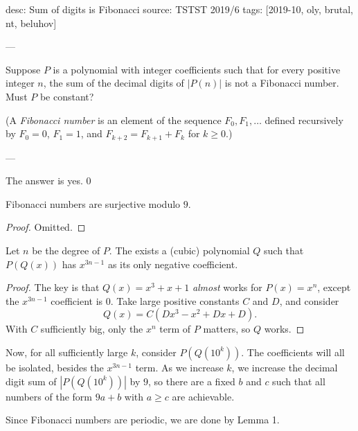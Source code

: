 desc: Sum of digits is Fibonacci
source: TSTST 2019/6
tags: [2019-10, oly, brutal, nt, beluhov]

---

Suppose $P$ is a polynomial with integer coefficients such that for every positive integer $n$, the sum of the decimal digits of $|P(n)|$ is not a Fibonacci number. Must $P$ be constant?

(A \emph{Fibonacci number} is an element of the sequence $F_0,F_1,\ldots$ defined recursively by $F_0=0$, $F_1=1$, and $F_{k+2}=F_{k+1}+F_k$ for $k\ge 0$.)

---

The answer is yes.
\setcounter{boxlemma}0
\begin{boxlemma}
    Fibonacci numbers are surjective modulo $9$.
\end{boxlemma}
\begin{proof}
    Omitted.
\end{proof}
\begin{boxlemma}
    Let $n$ be the degree of $P$. The exists a (cubic) polynomial $Q$ such that $P(Q(x))$ has $x^{3n-1}$ as its only negative coefficient.
\end{boxlemma}
\begin{proof}
    The key is that $Q(x)=x^3+x+1$ \emph{almost} works for $P(x)=x^n$, except the $x^{3n-1}$ coefficient is $0$. Take large positive constants $C$ and $D$, and consider \[Q(x)=C(Dx^3-x^2+Dx+D).\]
    With $C$ sufficiently big, only the $x^n$ term of $P$ matters, so $Q$ works.
\end{proof}

Now, for all sufficiently large $k$, consider $P(Q(10^k))$. The coefficients will all be isolated, besides the $x^{3n-1}$ term. As we increase $k$, we increase the decimal digit sum of $|P(Q(10^k))|$ by $9$, so there are a fixed $b$ and $c$ such that all numbers of the form $9a+b$ with $a\ge c$ are achievable.

Since Fibonacci numbers are periodic, we are done by Lemma 1.
